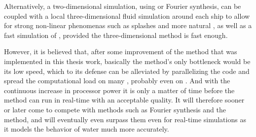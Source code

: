 Alternatively, a two-dimensional simulation, using \LPD or Fourier synthesis, can be coupled with a local three-dimensional fluid simulation around each ship to allow for strong non-linear phenomenas such as splashes and more natural \FSI, as well as a fast simulation of , provided the three-dimensional method is fast enough.

However, it is believed that, after some improvement of the method that was implemented in this thesis work, basically the method's only bottleneck would be its low speed, which to its defense can be alleviated by parallelizing the code and spread the computational load on many \CPUs, probably even on \GPUs. And with the continuous increase in processor power it is only a matter of time before the method can run in real-time with an acceptable quality. It will therefore sooner or later come to compete with methods such as Fourier synthesis and the \LPD method, and will eventually even surpass them even for real-time simulations as it models the behavior of water much more accurately.
